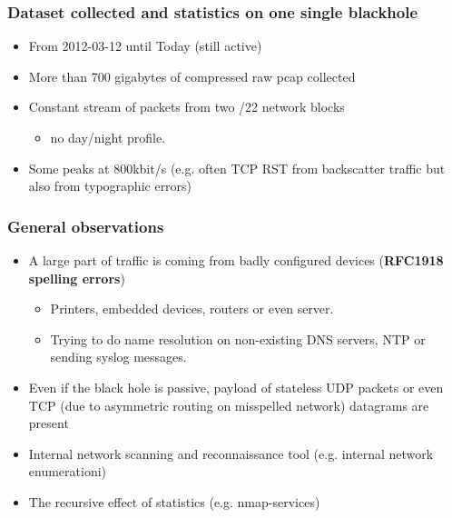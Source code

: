 \documentclass{beamer}
\begin{document}
\begin{frame}
\frametitle{Dataset collected and statistics on one single blackhole}
\begin{itemize}
    \item From 2012-03-12 until Today (still active)
    \item More than 700 gigabytes of compressed raw pcap collected
    \item Constant stream of packets from two /22 network blocks
    \begin{itemize}
        \item no day/night profile.
    \end{itemize}
    \item Some peaks at 800kbit/s (e.g. often TCP RST from backscatter traffic but also from typographic errors)
\end{itemize}
\end{frame}



\begin{frame}
\frametitle{General observations}
\begin{itemize}
    \item A large part of traffic is coming from badly configured devices (\textbf{RFC1918 spelling errors})
    \begin{itemize}
        \item Printers, embedded devices, routers or even server.
        \item Trying to do name resolution on non-existing DNS servers, NTP or sending syslog messages.
    \end{itemize}
    \item Even if the black hole is passive, payload of stateless UDP packets or even TCP (due to asymmetric routing on misspelled network) datagrams are present
    \item Internal network scanning and reconnaissance tool (e.g. internal network enumerationi)
    \item The recursive effect of statistics (e.g. nmap-services)
\end{itemize}
\end{frame}
\end{document}
